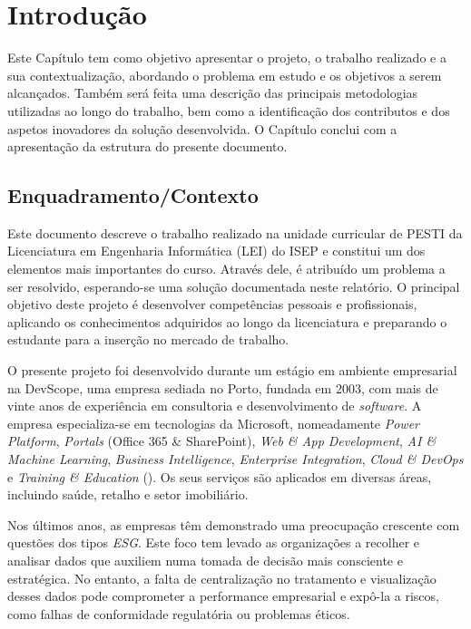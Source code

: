 \chapter{Introdução}
\label{chap:Intro}

Este Capítulo tem como objetivo apresentar o projeto, o trabalho realizado e a sua contextualização, abordando o problema em estudo e os objetivos a serem alcançados. Também será feita uma descrição das principais metodologias utilizadas ao longo do trabalho, bem como a identificação dos contributos e dos aspetos inovadores da solução desenvolvida. O Capítulo conclui com a apresentação da estrutura do presente documento.


\section{Enquadramento/Contexto} 
\label{sec:chap1_introduction} 

Este documento descreve o trabalho realizado na unidade curricular de \gls{PESTI} da Licenciatura em Engenharia Informática (LEI) do \gls{ISEP} e constitui um dos elementos mais importantes do curso. Através dele, é atribuído um problema a ser resolvido, esperando-se uma solução documentada neste relatório. O principal objetivo deste projeto é desenvolver competências pessoais e profissionais, aplicando os conhecimentos adquiridos ao longo da licenciatura e preparando o estudante para a inserção no mercado de trabalho.

O presente projeto foi desenvolvido durante um estágio em ambiente empresarial na DevScope, uma empresa sediada no Porto, fundada em 2003, com mais de vinte anos de experiência em consultoria e desenvolvimento de \textit{software}. A empresa especializa-se em tecnologias da Microsoft, nomeadamente \textit{Power Platform}, \textit{Portals} (Office 365 \& SharePoint), \textit{Web \& App Development}, \textit{AI \& Machine Learning}, \textit{Business Intelligence}, \textit{Enterprise Integration}, \textit{Cloud \& DevOps} e \textit{Training \& Education} (\cite{DevScopeSolutions}). Os seus serviços são aplicados em diversas áreas, incluindo saúde, retalho e setor imobiliário.

Nos últimos anos, as empresas têm demonstrado uma preocupação crescente com questões dos tipos \textit{\gls{ESG}}. Este foco tem levado as organizações a recolher e analisar dados que auxiliem numa tomada de decisão mais consciente e estratégica. No entanto, a falta de centralização no tratamento e visualização desses dados pode comprometer a performance empresarial e expô-la a riscos, como falhas de conformidade regulatória ou problemas éticos.

